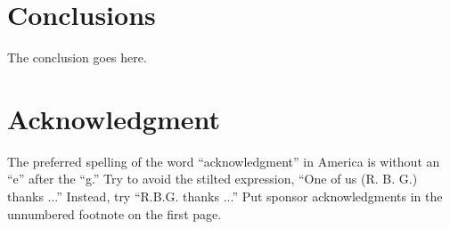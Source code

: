 \documentclass[conference,a4paper]{APSIPA2026}
\begin{document}
\section{Conclusions}
The conclusion goes here.

\section*{Acknowledgment}
The preferred spelling of the word ``acknowledgment'' in America is without an ``e'' after the ``g.''
Try to avoid the stilted expression, ``One of us (R. B. G.) thanks ...''
Instead, try ``R.B.G. thanks ...''
Put sponsor acknowledgments in the unnumbered footnote on the first page.










\printbibliography
\end{document}
